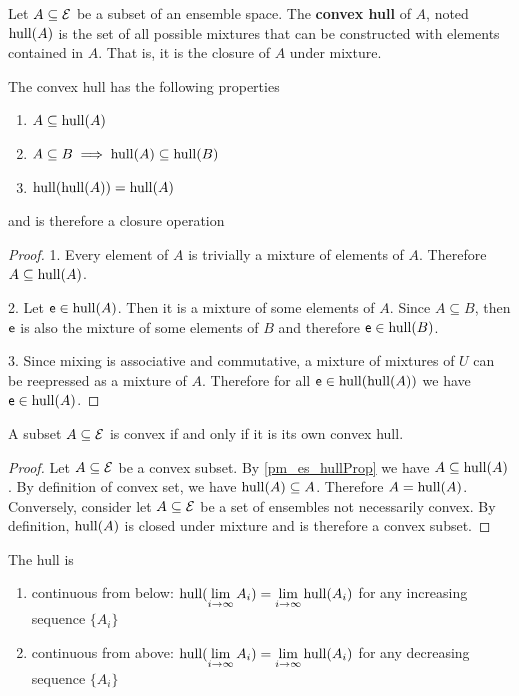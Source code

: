 \begin{defn}
	Let $A \subseteq \mathcal{E}$ be a subset of an ensemble space. The \textbf{convex hull} of $A$, noted $\mathrm{hull}(A)$ is the set of all possible mixtures that can be constructed with elements contained in $A$. That is, it is the closure of $A$ under mixture.
\end{defn}

\begin{coro}\label{pm_es_hullProp}
	The convex hull has the following properties
	\begin{enumerate}
		\item $A \subseteq \mathrm{hull}(A)$
		\item $A \subseteq B \implies \mathrm{hull}(A) \subseteq \mathrm{hull}(B)$
		\item $\mathrm{hull}(\mathrm{hull}(A)) = \mathrm{hull}(A)$
	\end{enumerate}
	and is therefore a closure operation
\end{coro}

\begin{proof}
	1. Every element of $A$ is trivially a mixture of elements of $A$. Therefore $A \subseteq \mathrm{hull}(A)$.
	
	2. Let $\mathsf{e} \in \mathrm{hull}(A)$. Then it is a mixture of some elements of $A$. Since $A \subseteq B$, then $\mathsf{e}$ is also the mixture of some elements of $B$ and therefore $\mathsf{e} \in \mathrm{hull}(B)$.
	
	3. Since mixing is associative and commutative, a mixture of mixtures of $U$ can be reepressed as a mixture of $A$. Therefore for all $\mathsf{e} \in \mathrm{hull}(\mathrm{hull}(A))$ we have $\mathsf{e} \in \mathrm{hull}(A)$.
\end{proof}

\begin{coro}
	A subset $A \subseteq \mathcal{E}$ is convex if and only if it is its own convex hull.
\end{coro}

\begin{proof}
	Let $A \subseteq \mathcal{E}$ be a convex subset. By \ref{pm_es_hullProp} we have $A \subseteq \mathrm{hull}(A)$. By definition of convex set, we have $\mathrm{hull}(A) \subseteq A$. Therefore $A = \mathrm{hull}(A)$. Conversely, consider let $A \subseteq \mathcal{E}$ be a set of ensembles not necessarily convex. By definition, $\mathrm{hull}(A)$ is closed under mixture and is therefore a convex subset.
\end{proof}

\begin{conj}
	The hull is
	\begin{enumerate}
		\item continuous from below: $\mathrm{hull}(\lim\limits_{i \to \infty} A_i) = \lim\limits_{i \to \infty} \mathrm{hull}(A_i)$ for any increasing sequence $\{A_i\}$
		\item continuous from above: $\mathrm{hull}(\lim\limits_{i \to \infty} A_i) = \lim\limits_{i \to \infty} \mathrm{hull}(A_i)$ for any decreasing sequence $\{A_i\}$
	\end{enumerate}
\end{conj}

